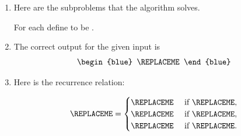 \begin{enumerate}[label=(\alph*)]

\item 


  Here are the subproblems that the algorithm solves.
  
  \begin{blue}
    For each
    \REPLACEME
    define
    \REPLACEME
    to be
    \REPLACEME.
  \end{blue}

\item


  The correct output for the given input is \[
    \begin{blue}
      \REPLACEME
    \end{blue}
  \]

\item



  Here is the recurrence relation:

  \begin{blue}
    \[
      \REPLACEME =
      \begin{cases}
        \REPLACEME & \text{ if } \REPLACEME, \\
        \REPLACEME & \text{ if } \REPLACEME, \\
        \REPLACEME & \text{ if } \REPLACEME.
      \end{cases}
    \]
  \end{blue}


\end{enumerate}
